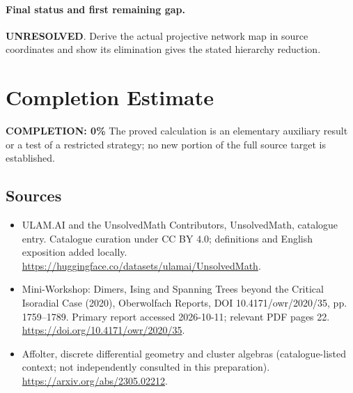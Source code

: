 \documentclass[11pt]{article}
\begin{document}
\paragraph{Final status and first remaining gap.}
\textbf{UNRESOLVED}. Derive the actual projective network map in source coordinates and show its elimination gives the stated hierarchy reduction.

\section{Completion Estimate}
\noindent\textbf{COMPLETION: 0\%}
The proved calculation is an elementary auxiliary result or a test of a restricted strategy; no new portion of the full source target is established.

\subsection{Sources}
\begin{itemize}
\item[\hypertarget{source:statement:1}{S1}] ULAM.AI and the UnsolvedMath Contributors, UnsolvedMath, catalogue entry. Catalogue curation under CC BY 4.0; definitions and English exposition added locally.
\url{https://huggingface.co/datasets/ulamai/UnsolvedMath}.
\item[\hypertarget{source:statement:2}{S2}] Mini-Workshop: Dimers, Ising and Spanning Trees beyond the Critical Isoradial Case (2020), Oberwolfach Reports, DOI 10.4171/owr/2020/35, pp. 1759--1789. Primary report accessed 2026-10-11; relevant PDF pages 22.
\url{https://doi.org/10.4171/owr/2020/35}.
\item[\hypertarget{source:statement:3}{S3}] Affolter, discrete differential geometry and cluster algebras (catalogue-listed context; not independently consulted in this preparation).
\url{https://arxiv.org/abs/2305.02212}.
\end{itemize}
\label{end:statement}
\end{document}
